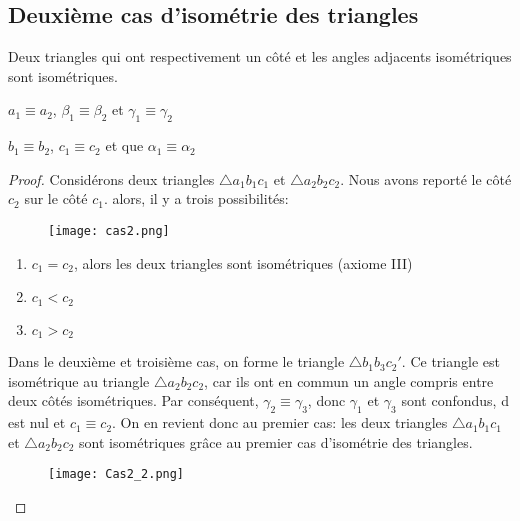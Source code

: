 \documentclass[a4paper,12pt]{article}
\begin{document}
\pagebreak
\subsection{Deuxième cas d'isométrie des triangles}
\begin{theorem}
Deux triangles qui ont respectivement un côté et les angles adjacents isométriques sont isométriques.
\end{theorem}
\begin{hyp}
$a_1 \equiv a_2$, $\beta_1 \equiv \beta_2$ et $\gamma_1 \equiv \gamma_2$
\end{hyp}
\begin{concl}
$b_1 \equiv b_2$, $c_1 \equiv c_2$ et que $\alpha_1 \equiv \alpha_2$
\end{concl}
\begin{proof}
Considérons deux triangles $\triangle a_1b_1c_1$ et $\triangle a_2b_2c_2$. Nous avons reporté le côté $c_2$ sur le côté $c_1$. alors, il y a trois possibilités:
\begin{figure}[H]
    \centering
    \texttt{[image: cas2.png]}
\end{figure}
\begin{enumerate}
\item $c_1 = c_2$, alors les deux triangles sont isométriques (axiome III)
\item $c_1<c_2$
\item $c_1>c_2$
\end{enumerate}

\pagebreak
Dans le deuxième et troisième cas, on forme le triangle $\triangle b_1b_3c_2'$. Ce triangle est isométrique au triangle $\triangle a_2b_2c_2$, car ils ont en commun un angle compris entre deux côtés isométriques. Par conséquent, $\gamma_2\equiv \gamma_3$, donc $\gamma_1$ et $\gamma_3$ sont confondus, d est nul et $c_1\equiv c_2$. On en revient donc au premier cas: les deux triangles $\triangle a_1b_1c_1$ et $\triangle a_2b_2c_2$ sont isométriques grâce au premier cas d'isométrie des triangles.


\begin{figure}[H]
    \centering
    \texttt{[image: Cas2\_2.png]}
\end{figure}



\end{proof}
\end{document}
